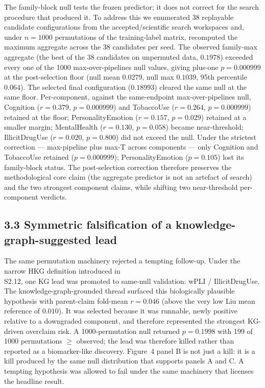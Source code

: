 \documentclass[11pt,letterpaper]{report}
\begin{document}
The family-block null tests the frozen predictor; it does not correct for the search procedure that produced it. To address this we enumerated 38 replayable candidate configurations from the accepted/scientific search workspaces and, under $n = 1000$ permutations of the training-label matrix, recomputed the maximum aggregate across the 38 candidates per seed. The observed family-max aggregate (the best of the 38 candidates on unpermuted data, $0.1978$) exceeded every one of the 1000 max-over-pipelines null values, giving plus-one $p = 0.000999$ at the post-selection floor (null mean $0.0279$, null max $0.1039$, 95th percentile $0.064$). The selected final configuration ($0.18993$) cleared the same null at the same floor. Per-component, against the same-endpoint max-over-pipelines null, Cognition ($r = 0.379$, $p = 0.000999$) and TobaccoUse ($r = 0.264$, $p = 0.000999$) retained at the floor; PersonalityEmotion ($r = 0.157$, $p = 0.029$) retained at a smaller margin; MentalHealth ($r = 0.130$, $p = 0.058$) became near-threshold; IllicitDrugUse ($r = 0.020$, $p = 0.800$) did not exceed the null. Under the strictest correction --- max-pipeline plus max-T across components --- only Cognition and TobaccoUse retained ($p = 0.000999$); PersonalityEmotion ($p = 0.105$) lost its family-block status. The post-selection correction therefore preserves the methodological core claim (the aggregate predictor is not an artefact of search) and the two strongest component claims, while shifting two near-threshold per-component verdicts.

\subsection*{3.3 Symmetric falsification of a knowledge-graph-suggested lead}

The same permutation machinery rejected a tempting follow-up. Under the narrow HKG definition introduced in \\S2.12, one KG lead was promoted to same-null validation: wPLI / IllicitDrugUse. The knowledge-graph-grounded thread surfaced this biologically plausible hypothesis with parent-claim fold-mean $r = 0.046$ (above the very low Liu mean reference of $0.010$). It was selected because it was runnable, newly positive relative to a downgraded component, and therefore represented the strongest KG-driven overclaim risk. A 1000-permutation null returned $p = 0.1998$ with 199 of 1000 permutations $\ge$ observed; the lead was therefore killed rather than reported as a biomarker-like discovery. Figure~4 panel B is not just a kill: it is a kill produced by the same null distribution that supports panels A and C. A tempting hypothesis was allowed to fail under the same machinery that licenses the headline result.
\end{document}

